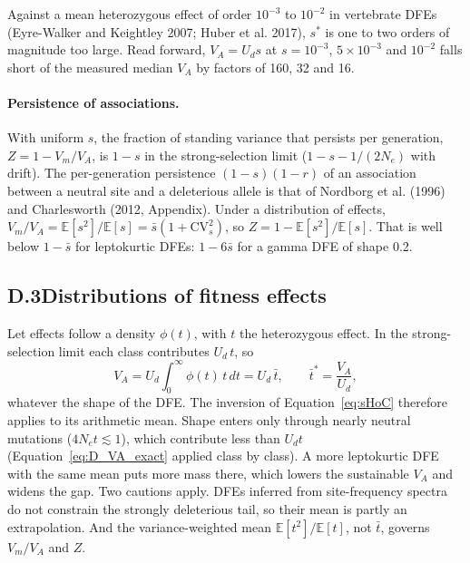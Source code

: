 \documentclass[12pt]{article}
\begin{document}
Against a mean heterozygous effect of order $10^{-3}$ to $10^{-2}$ in vertebrate DFEs (Eyre-Walker and Keightley 2007; Huber et al. 2017), $s^*$ is one to two orders of magnitude too large. Read forward, $V_A = U_ds$ at $s = 10^{-3}$, $5 \times 10^{-3}$ and $10^{-2}$ falls short of the measured median $V_A$ by factors of 160, 32 and 16.

\paragraph{Persistence of associations.} With uniform $s$, the fraction of standing variance that persists per generation, $Z = 1 - V_m/V_A$, is $1 - s$ in the strong-selection limit ($1 - s - 1/(2N_e)$ with drift). The per-generation persistence $(1-s)(1-r)$ of an association between a neutral site and a deleterious allele is that of Nordborg et al. (1996) and Charlesworth (2012, Appendix). Under a distribution of effects, $V_m/V_A = \mathbb{E}[s^2]/\mathbb{E}[s] = \bar{s}(1 + \mathrm{CV}_s^2)$, so $Z = 1 - \mathbb{E}[s^2]/\mathbb{E}[s]$. That is well below $1 - \bar{s}$ for leptokurtic DFEs: $1 - 6\bar{s}$ for a gamma DFE of shape 0.2.

\subsection*{D.3\quad Distributions of fitness effects}

Let effects follow a density $\phi(t)$, with $t$ the heterozygous effect. In the strong-selection limit each class contributes $U_d\,t$, so
\begin{equation}
    V_A = U_d \int_0^\infty \phi(t)\,t\,dt = U_d\,\bar{t}, \qquad \bar{t}^* = \frac{V_A}{U_d},
\label{eq:VA_DFE}
\end{equation}
whatever the shape of the DFE. The inversion of Equation~\eqref{eq:sHoC} therefore applies to its arithmetic mean. Shape enters only through nearly neutral mutations ($4N_et \lesssim 1$), which contribute less than $U_dt$ (Equation~\eqref{eq:D_VA_exact} applied class by class). A more leptokurtic DFE with the same mean puts more mass there, which lowers the sustainable $V_A$ and widens the gap. Two cautions apply. DFEs inferred from site-frequency spectra do not constrain the strongly deleterious tail, so their mean is partly an extrapolation. And the variance-weighted mean $\mathbb{E}[t^2]/\mathbb{E}[t]$, not $\bar{t}$, governs $V_m/V_A$ and $Z$.
\end{document}

